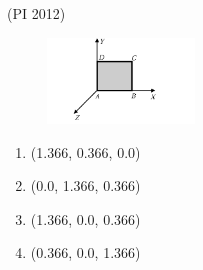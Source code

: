 \hfill{(PI 2012)}
\begin{figure}[h!]
\centering
\includegraphics[width=0.35\textwidth]{GATE/2012/PI/figs/39-GATE-PI-2012.png}
\caption{}
\label{q39}
\end{figure}
  \begin{multicols}{2}
\begin{enumerate}
\item (1.366, 0.366, 0.0)
\item (0.0, 1.366, 0.366)
\item (1.366, 0.0, 0.366)
\item (0.366, 0.0, 1.366)
\end{enumerate}
\end{multicols}

